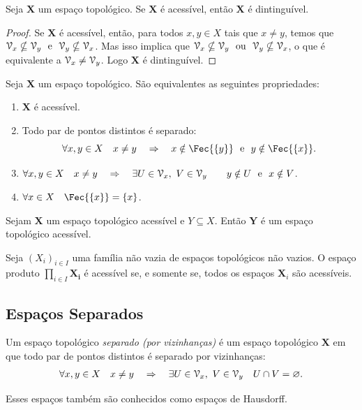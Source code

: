 \begin{prop}[$T_1 \Rightarrow T_0$]
Seja $\bm X$ um espaço topológico. Se $\bm X$ é acessível, então $\bm X$ é dintinguível.
\end{prop}
\begin{proof}
Se $\bm X$ é acessível, então, para todos $x,y \in X$ tais que $x \neq y$, temos que $\mathcal{V}_x \nsubseteq \mathcal{V}_y \text{\ \ e\ \ } \mathcal{V}_y \nsubseteq \mathcal{V}_x$. Mas isso implica que $\mathcal{V}_x \nsubseteq \mathcal{V}_y \text{\ \ ou\ \ } \mathcal{V}_y \nsubseteq \mathcal{V}_x$, o que é equivalente a $\mathcal{V}_x \neq \mathcal{V}_y$. Logo $\bm X$ é dintinguível.
\end{proof}

\begin{prop}
Seja $\bm X$ um espaço topológico. São equivalentes as seguintes propriedades:
	\begin{enumerate}
	\item $\bm X$ é acessível.
	\item Todo par de pontos distintos é separado:
		\begin{equation*}
		\forall x,y \in X \quad x \neq y \quad \Rightarrow \quad x \notin \Fec{\{y\}} \e y \notin \Fec{\{x\}}.
		\end{equation*}
	\item $\forall x,y \in X \quad x \neq y \quad \Rightarrow \quad \exists U \in \mathcal{V}_x,\ V \in \mathcal{V}_y \qquad y \notin U \text{\ \ e\ \ } x \notin V$.
	\item $\forall x \in X \quad \Fec{\{x\}}=\{x\}$.
	\end{enumerate}
\end{prop}

\begin{prop}
Sejam $\bm X$ um espaço topológico acessível e  $Y \subseteq X$. Então $\bm Y$ é um espaço topológico acessível.
\end{prop}

\begin{prop}
Seja $(X_i)_{i \in I}$ uma família não vazia de espaços topológicos não vazios. O espaço produto $\prod_{i \in I} \bm{X_i}$ é acessível se, e somente se, todos os espaços $\bm X_i$ são acessíveis.
\end{prop}

\subsection{Espaços Separados}

\begin{defi}[$T_2$]
Um espaço topológico \emph{separado (por vizinhanças)} é um espaço topológico $\bm X$ em que todo par de pontos distintos é separado por vizinhanças:
	\begin{equation*}
	\forall x,y \in X \quad x \neq y \quad \Rightarrow \quad \exists U \in \mathcal{V}_x,\ V \in \mathcal{V}_y \quad U \cap V = \varnothing.
	\end{equation*}
\end{defi}
Esses espaços também são conhecidos como espaços de Hausdorff.

